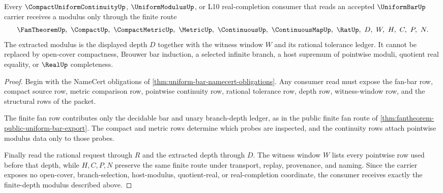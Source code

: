 \begin{theorem}
\label{thm:uniform-bar-finite-depth-modulus}
Every $\CompactUniformContinuityUp$, $\UniformModulusUp$, or L10 real-completion consumer that reads an accepted $\UniformBarUp$ carrier receives a modulus only through the finite route
$$
\FanTheoremUp,\ \CompactUp,\ \CompactMetricUp,\ \MetricUp,\ \ContinuousUp,\ \ContinuousMapUp,\ \RatUp,\ D,\ W,\ H,\ C,\ P,\ N .
$$
The extracted modulus is the displayed depth $D$ together with the witness window $W$ and its rational tolerance ledger. It cannot be replaced by open-cover compactness, Brouwer bar induction, a selected infinite branch, a host supremum of pointwise moduli, quotient real equality, or $\RealUp$ completeness.
\end{theorem}
\begin{proof}
Begin with the NameCert obligations of \autoref{thm:uniform-bar-namecert-obligations}. Any consumer read must expose the fan-bar row, compact source row, metric comparison row, pointwise continuity row, rational tolerance row, depth row, witness-window row, and the structural rows of the packet.

The finite fan row contributes only the decidable bar and unary branch-depth ledger, as in the public finite fan route of \autoref{thm:fantheorem-public-uniform-bar-export}. The compact and metric rows determine which probes are inspected, and the continuity rows attach pointwise modulus data only to those probes.

Finally read the rational request through $R$ and the extracted depth through $D$. The witness window $W$ lists every pointwise row used before that depth, while $H,C,P,N$ preserve the same finite route under transport, replay, provenance, and naming. Since the carrier exposes no open-cover, branch-selection, host-modulus, quotient-real, or real-completion coordinate, the consumer receives exactly the finite-depth modulus described above.
\end{proof}



